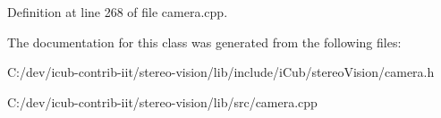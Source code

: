 Definition at line 268 of file camera.\+cpp.


\begin{DoxyCode}{0}

\end{DoxyCode}


The documentation for this class was generated from the following files\+:\begin{DoxyCompactItemize}
\item 
C\+:/dev/icub-\/contrib-\/iit/stereo-\/vision/lib/include/i\+Cub/stereo\+Vision/camera.\+h\item 
C\+:/dev/icub-\/contrib-\/iit/stereo-\/vision/lib/src/camera.\+cpp\end{DoxyCompactItemize}
